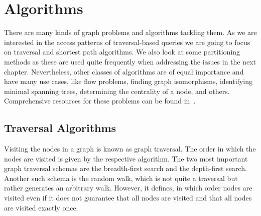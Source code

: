     \newpage
    \section{Algorithms}\label{queries}
        There are many kinds of graph problems and algorithms tackling them. As we are interested in the access patterns of traversal-based queries we are going to focus on traversal and shortest path algorithms. We also look at some partitioning methods as these are used quite frequently when addressing the issues in the next chapter.
        Nevertheless, other classes of algorithms are of equal importance and have many use cases, like flow problems, finding graph isomorphisms, identifying minimal spanning trees, determining the centrality of a node, and others.
        Comprehensive resources for these problems can be found in~\autocite{steger2007diskrete, Gross1998GraphTA, aho1974design, cormen2009introduction, Goodrich2014AlgorithmDA}.
        
        \subsection{Traversal Algorithms}
            Visiting the nodes in a graph is known as graph traversal. 
            The order in which the nodes are visited is given by the respective algorithm. 
            The two most important graph traversal schemas are the breadth-first search and the depth-first search. 
            Another such schema is the random walk, which is not quite a traversal but rather generates an arbitrary walk. 
            However, it defines, in which order nodes are visited even if it does not guarantee that all nodes are visited and that all nodes are visited exactly once.
